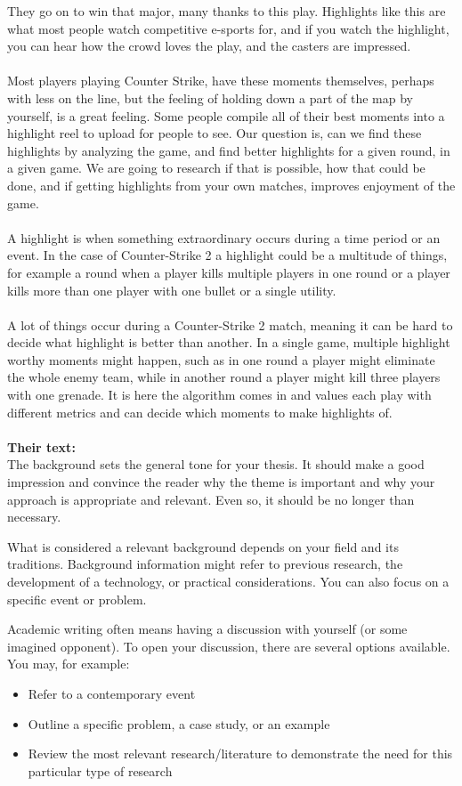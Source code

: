 \documentclass[a4paper,twoside]{bth}
\begin{document}
They go on to win that major, many thanks to this play. Highlights like this are what most people watch competitive e-sports for, and if you watch the highlight, you can hear how the crowd loves the play, and the casters are impressed.\\\\
Most players playing Counter Strike, have these moments themselves, perhaps with less on the line, but the feeling of holding down a part of the map by yourself, is a great feeling. Some people compile all of their best moments into a highlight reel to upload for people to see. Our question is, can we find these highlights by analyzing the game, and find better highlights for a given round, in a given game. We are going to research if that is possible, how that could be done, and if getting highlights from your own matches, improves enjoyment of the game.\\\\
A highlight is when something extraordinary occurs during a time period or an event. In the case of Counter-Strike 2 a highlight could be a multitude of things, for example a round when a player kills multiple players in one round or a player kills more than one player with one bullet or a single utility.\\\\
A lot of things occur during a Counter-Strike 2 match, meaning it can be hard to decide what highlight is better than another. In a single game, multiple highlight worthy moments might happen, such as in one round a player might eliminate the whole enemy team, while in another round a player might kill three players with one grenade. It is here the algorithm comes in and values each play with different metrics and can decide which moments to make highlights of.\\\\

\textbf{Their text:}\\
The background sets the general tone for your thesis. It should make a good impression and convince the reader why the theme is important and why your approach is appropriate and relevant. Even so, it should be no longer than necessary.

What is considered a relevant background depends on your field and its traditions. Background information might refer to previous research, the development of a technology, or practical considerations. You can also focus on a specific event or problem.

Academic writing often means having a discussion with yourself (or some imagined opponent). To open your discussion, there are several options available. You may, for example:
\begin{itemize}
    \item Refer to a contemporary event
    \item Outline a specific problem, a case study, or an example
    \item Review the most relevant research/literature to demonstrate the need for this particular type of research 
\end{itemize}
\end{document}
